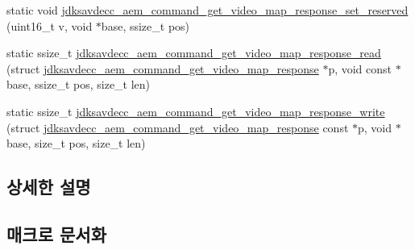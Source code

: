 \begin{DoxyCompactItemize}
\item 
static void \hyperlink{group__command__get__video__map__response_ga467dac1ade94cdb647d2357d12c6533d}{jdksavdecc\+\_\+aem\+\_\+command\+\_\+get\+\_\+video\+\_\+map\+\_\+response\+\_\+set\+\_\+reserved} (uint16\+\_\+t v, void $\ast$base, ssize\+\_\+t pos)
\item 
static ssize\+\_\+t \hyperlink{group__command__get__video__map__response_ga7462eff023fc2cf51c2353e883650acf}{jdksavdecc\+\_\+aem\+\_\+command\+\_\+get\+\_\+video\+\_\+map\+\_\+response\+\_\+read} (struct \hyperlink{structjdksavdecc__aem__command__get__video__map__response}{jdksavdecc\+\_\+aem\+\_\+command\+\_\+get\+\_\+video\+\_\+map\+\_\+response} $\ast$p, void const $\ast$base, ssize\+\_\+t pos, size\+\_\+t len)
\item 
static ssize\+\_\+t \hyperlink{group__command__get__video__map__response_ga184c3bd7c9052f068f903138b5d9d030}{jdksavdecc\+\_\+aem\+\_\+command\+\_\+get\+\_\+video\+\_\+map\+\_\+response\+\_\+write} (struct \hyperlink{structjdksavdecc__aem__command__get__video__map__response}{jdksavdecc\+\_\+aem\+\_\+command\+\_\+get\+\_\+video\+\_\+map\+\_\+response} const $\ast$p, void $\ast$base, size\+\_\+t pos, size\+\_\+t len)
\end{DoxyCompactItemize}


\subsection{상세한 설명}


\subsection{매크로 문서화}
